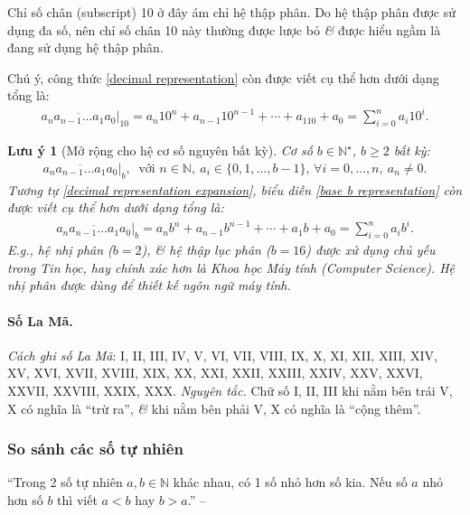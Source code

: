 \documentclass{article}
\numberwithin{equation}{section}
\newtheorem{luuy}{Lưu ý}[section]
\begin{document}
Chỉ số chân (subscript) 10 ở đây ám chỉ hệ thập phân. Do hệ thập phân được sử dụng đa số, nên chỉ số chân 10 này thường được lược bỏ \textit{\&} được hiểu ngầm là đang sử dụng hệ thập phân.

Chú ý, công thức \eqref{decimal representation} còn được viết cụ thể hơn dưới dạng tổng là:
\begin{align}
	\label{decimal representation expansion}
	\overline{a_na_{n-1}\ldots a_1a_0}|_{10} = a_n10^n + a_{n-1}10^{n-1} + \cdots + a_110 + a_0 = \sum_{i=0}^n a_i10^i.
\end{align}

\begin{luuy}[Mở rộng cho hệ cơ số nguyên bất kỳ]
	Cơ số $b\in\mathbb{N}^\star$, $b\ge 2$ bất kỳ:
	\begin{align}
		\label{base b representation}
		\overline{a_na_{n-1}\ldots a_1a_0}|_{b},\ \mbox{ với } n\in\mathbb{N},\ a_i\in\{0,1,\ldots,b - 1\},\,\forall i = 0,\ldots,n,\ a_n\ne 0.
	\end{align}
	Tương tự \eqref{decimal representation expansion}, biểu diễn \eqref{base b representation} còn được viết cụ thể hơn dưới dạng tổng là:
	\begin{align}
		\label{base b representation expansion}
		\overline{a_na_{n-1}\ldots a_1a_0}|_{b} = a_nb^n + a_{n-1}b^{n-1} + \cdots + a_1b + a_0 = \sum_{i=0}^n a_ib^i.
	\end{align}
	E.g., hệ nhị phân ($b = 2$), \textit{\&} hệ thập lục phân ($b = 16$) được xử dụng chủ yếu trong Tin học, hay chính xác hơn là Khoa học Máy tính (Computer Science). Hệ nhị phân được dùng để thiết kế ngôn ngữ máy tính.
\end{luuy}

\paragraph{Số La Mã.} \textit{Cách ghi số La Mã}: I, II, III, IV, V, VI, VII, VIII, IX, X, XI, XII, XIII, XIV, XV, XVI, XVII, XVIII, XIX, XX, XXI, XXII, XXIII, XXIV, XXV, XXVI, XXVII, XXVIII, XXIX, XXX. \textit{Nguyên tắc.} Chữ số I, II, III khi nằm bên trái V, X có nghĩa là ``trừ ra'', \textit{\&} khi nằm bên phải V, X có nghĩa là ``cộng thêm''.

\subsubsection{So sánh các số tự nhiên}
``Trong 2 số tự nhiên $a,b\in\mathbb{N}$ khác nhau, có 1 số nhỏ hơn số kia. Nếu số $a$ nhỏ hơn số $b$ thì viết $a < b$ hay $b > a$.'' -- \cite[p. 12]{SGK_Toan_6_Canh_Dieu_tap_1}
\end{document}
